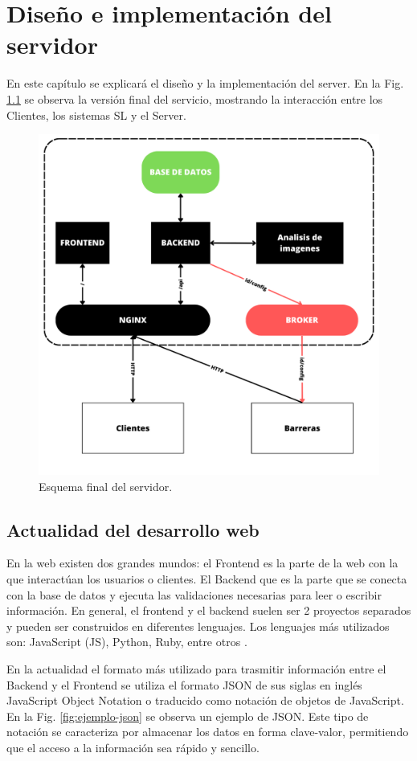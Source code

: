 \chapter{Diseño e implementación del servidor}

En este capítulo se explicará el diseño y la implementación del server. En la Fig. \ref{fig:server-final} se observa la versión final del servicio, mostrando la interacción entre los Clientes, los sistemas SL y el Server.

\begin{figure}[h]
    \centering
    \includegraphics[width=.6\textwidth]{imgs/server-esquema.png}
    \caption{Esquema final del servidor.}
    \label{fig:server-final}
\end{figure}

\section{Actualidad del desarrollo web}

En la web existen dos grandes mundos: el Frontend es la parte de la web con la que interactúan los usuarios o clientes. El Backend que es la parte que se conecta con la base de datos y ejecuta las validaciones necesarias para leer o escribir información. En general, el frontend y el backend suelen ser 2 proyectos separados y pueden ser construidos en diferentes lenguajes. Los lenguajes más utilizados son: JavaScript (JS), Python, Ruby, entre otros \cite{presta_10_2021}.

En la actualidad el formato más utilizado para trasmitir información entre el Backend y el Frontend se utiliza el formato JSON de sus siglas en inglés JavaScript Object Notation o traducido como notación de objetos de JavaScript. En la Fig. \ref{fig:ejemplo-json} se observa un ejemplo de JSON. Este tipo de notación se caracteriza por almacenar los datos en forma clave-valor, permitiendo que el acceso a la información sea rápido y sencillo.

